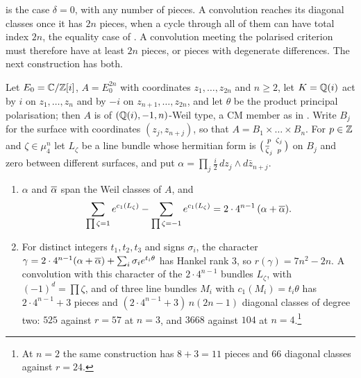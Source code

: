 \cite[Theorem~9.20]{paperI} is the case $\delta=0$, with any number of pieces. A
convolution reaches its diagonal classes once it has $2n$ pieces, when a
cycle through all of them can have total index $2n$, the equality case of
. A convolution meeting the polarised criterion must
therefore have at least $2n$ pieces, or pieces with degenerate differences.
The next construction has both.

\begin{proposition}
\label{prop:weilpieces}
Let $E_{0}=\mathbb{C}/\mathbb{Z}[i]$, $A=E_{0}^{2n}$ with coordinates $z_{1},\dots,z_{2n}$
and $n\ge2$, let $K=\mathbb{Q}(i)$ act by $i$ on $z_{1},\dots,z_{n}$ and by $-i$
on $z_{n+1},\dots,z_{2n}$, and let $\theta$ be the product principal
polarisation; then $A$ is of $(\mathbb{Q}(i),-1,n)$-Weil type, a CM member as in
\cite[Remark~17.6]{paperI}. Write $B_{j}$ for the surface with coordinates
$(z_{j},z_{n+j})$, so that $A=B_{1}\times\dots\times B_{n}$. For $p\in\mathbb{Z}$
and $\zeta\in\mu_{4}^{n}$ let $L_{\zeta}$ be a line bundle whose hermitian
form is $\bigl(\begin{smallmatrix}p&\zeta_{j}\\ \overline{\zeta}_{j}&p
\end{smallmatrix}\bigr)$ on $B_{j}$ and zero between different surfaces, and
put $\alpha=\prod_{j}\tfrac{i}{2}\,dz_{j}\wedge d\bar z_{n+j}$.
\begin{enumerate}[label=\textup{(\roman*)},leftmargin=2.6em,itemsep=2pt]
\item $\alpha$ and $\overline{\alpha}$ span the Weil classes of $A$, and
  \[
    \sum_{\prod\zeta=1}e^{c_{1}(L_{\zeta})}
    -\sum_{\prod\zeta=-1}e^{c_{1}(L_{\zeta})}
    =2\cdot4^{n-1}\,(\alpha+\overline{\alpha}).
  \]
\item For distinct integers $t_{1},t_{2},t_{3}$ and signs $\sigma_{i}$, the
  character
  $\gamma=2\cdot4^{n-1}(\alpha+\overline{\alpha})+\sum_{i}\sigma_{i}e^{t_{i}\theta}$
  has Hankel rank $3$, so $r(\gamma)=7n^{2}-2n$. A convolution with this
  character of the $2\cdot4^{n-1}$ bundles $L_{\zeta}$, with
  $(-1)^{d}=\prod\zeta$, and of three line bundles $M_{i}$ with
  $c_{1}(M_{i})=t_{i}\theta$ has $2\cdot4^{n-1}+3$ pieces and
  $(2\cdot4^{n-1}+3)\,n(2n-1)$ diagonal classes of degree two: $525$
  against $r=57$ at $n=3$, and $3668$ against $104$ at
  $n=4$.\footnote{At $n=2$ the same construction has $8+3=11$ pieces and
  $66$ diagonal classes against $r=24$.}
\end{enumerate}
\end{proposition}

